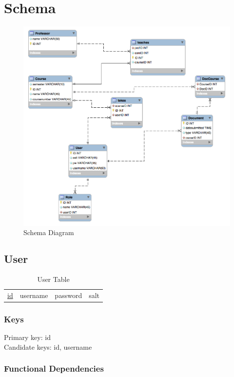 \documentclass[11pt]{article}
\begin{document}
\section{Schema}
\label{sec-3}


    \begin{figure}[htb]
    \centering
    \includegraphics[width=.9\linewidth]{Schema.png}
    \caption{Schema Diagram}
    \end{figure}
\subsection{User}
\label{sec-3-1}


\begin{table}[htb]
\caption{User Table} 
\begin{center}
\begin{tabular}{llll}
 \underline{id}  &  username  &  password  &  salt  \\
\end{tabular}
\end{center}
\end{table}
\subsubsection{Keys}
\label{sec-3-1-1}

    
    Primary key: id\\
    Candidate keys: id, username\\
\subsubsection{Functional Dependencies}
\label{sec-3-1-2}
\end{document}
